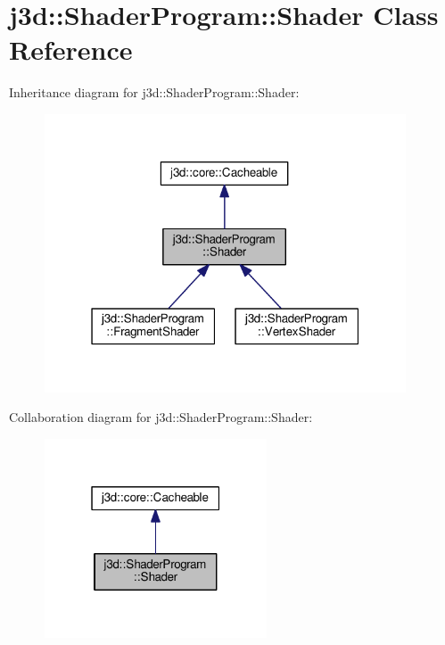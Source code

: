 \hypertarget{classj3d_1_1ShaderProgram_1_1Shader}{}\section{j3d\+:\+:Shader\+Program\+:\+:Shader Class Reference}
\label{classj3d_1_1ShaderProgram_1_1Shader}


Inheritance diagram for j3d\+:\+:Shader\+Program\+:\+:Shader\+:
\nopagebreak
\begin{figure}[H]
\begin{center}
\leavevmode
\includegraphics[width=304pt]{classj3d_1_1ShaderProgram_1_1Shader__inherit__graph}
\end{center}
\end{figure}


Collaboration diagram for j3d\+:\+:Shader\+Program\+:\+:Shader\+:
\nopagebreak
\begin{figure}[H]
\begin{center}
\leavevmode
\includegraphics[width=187pt]{classj3d_1_1ShaderProgram_1_1Shader__coll__graph}
\end{center}
\end{figure}
